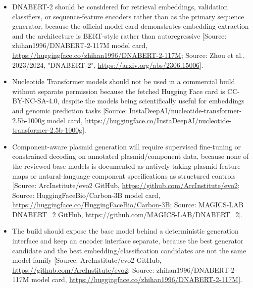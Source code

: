 \documentclass[11pt]{report}
\begin{document}
\begin{itemize}
\item DNABERT-2 should be considered for retrieval embeddings, validation classifiers, or sequence-feature encoders rather than as the primary sequence generator, because the official model card demonstrates embedding extraction and the architecture is BERT-style rather than autoregressive [Source: zhihan1996/DNABERT-2-117M model card, \url{https://huggingface.co/zhihan1996/DNABERT-2-117M}; Source: Zhou et al., 2023/2024, "DNABERT-2", \url{https://arxiv.org/abs/2306.15006}].
\item Nucleotide Transformer models should not be used in a commercial build without separate permission because the fetched Hugging Face card is CC-BY-NC-SA-4.0, despite the models being scientifically useful for embeddings and genomic prediction tasks [Source: InstaDeepAI/nucleotide-transformer-2.5b-1000g model card, \url{https://huggingface.co/InstaDeepAI/nucleotide-transformer-2.5b-1000g}].
\item Component-aware plasmid generation will require supervised fine-tuning or constrained decoding on annotated plasmid/component data, because none of the reviewed base models is documented as natively taking plasmid feature maps or natural-language component specifications as structured controls [Source: ArcInstitute/evo2 GitHub, \url{https://github.com/ArcInstitute/evo2}; Source: HuggingFaceBio/Carbon-3B model card, \url{https://huggingface.co/HuggingFaceBio/Carbon-3B}; Source: MAGICS-LAB DNABERT\_2 GitHub, \url{https://github.com/MAGICS-LAB/DNABERT_2}].
\item The build should expose the base model behind a deterministic generation interface and keep an encoder interface separate, because the best generator candidate and the best embedding/classification candidates are not the same model family [Source: ArcInstitute/evo2 GitHub, \url{https://github.com/ArcInstitute/evo2}; Source: zhihan1996/DNABERT-2-117M model card, \url{https://huggingface.co/zhihan1996/DNABERT-2-117M}].
\end{itemize}
\end{document}
